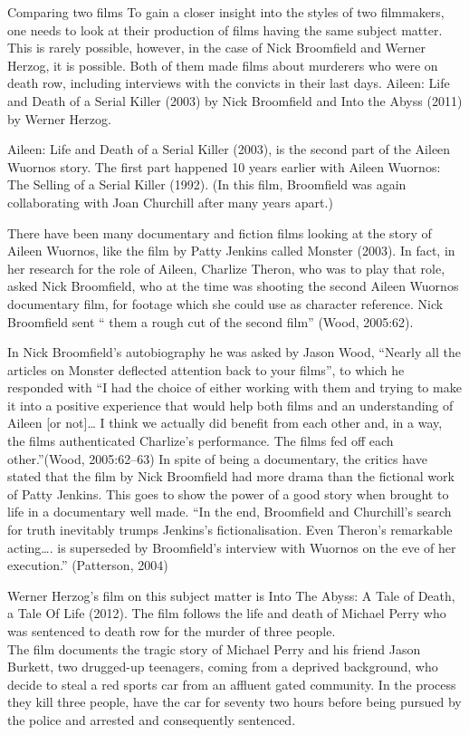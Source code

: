 \documentclass[
  12pt,
]{book}
\begin{document}
Comparing two films To gain a closer insight into the styles of two filmmakers, one needs to look at their production of films having the same subject matter. This is rarely possible, however, in the case of Nick Broomfield and Werner Herzog, it is possible. Both of them made films about murderers who were on death row, including interviews with the convicts in their last days. Aileen: Life and Death of a Serial Killer (2003) by Nick Broomfield and Into the Abyss (2011) by Werner Herzog.

Aileen: Life and Death of a Serial Killer (2003), is the second part of the Aileen Wuornos story. The first part happened 10 years earlier with Aileen Wuornos: The Selling of a Serial Killer (1992). (In this film, Broomfield was again collaborating with Joan Churchill after many years apart.)

There have been many documentary and fiction films looking at the story of Aileen Wuornos, like the film by Patty Jenkins called Monster (2003). In fact, in her research for the role of Aileen, Charlize Theron, who was to play that role, asked Nick Broomfield, who at the time was shooting the second Aileen Wuornos documentary film, for footage which she could use as character reference. Nick Broomfield sent `` them a rough cut of the second film'' (Wood, 2005:62).

In Nick Broomfield's autobiography he was asked by Jason Wood, ``Nearly all the articles on Monster deflected attention back to your films'', to which he responded with ``I had the choice of either working with them and trying to make it into a positive experience that would help both films and an understanding of Aileen {[}or not{]}\ldots{} I think we actually did benefit from each other and, in a way, the films authenticated Charlize's performance. The films fed off each other.''(Wood, 2005:62--63) In spite of being a documentary, the critics have stated that the film by Nick Broomfield had more drama than the fictional work of Patty Jenkins. This goes to show the power of a good story when brought to life in a documentary well made. ``In the end, Broomfield and Churchill's search for truth inevitably trumps Jenkins's fictionalisation. Even Theron's remarkable acting\ldots. is superseded by Broomfield's interview with Wuornos on the eve of her execution.'' (Patterson, 2004)

Werner Herzog's film on this subject matter is Into The Abyss: A Tale of Death, a Tale Of Life (2012). The film follows the life and death of Michael Perry who was sentenced to death row for the murder of three people.\\
The film documents the tragic story of Michael Perry and his friend Jason Burkett, two drugged-up teenagers, coming from a deprived background, who decide to steal a red sports car from an affluent gated community. In the process they kill three people, have the car for seventy two hours before being pursued by the police and arrested and consequently sentenced.
\end{document}
